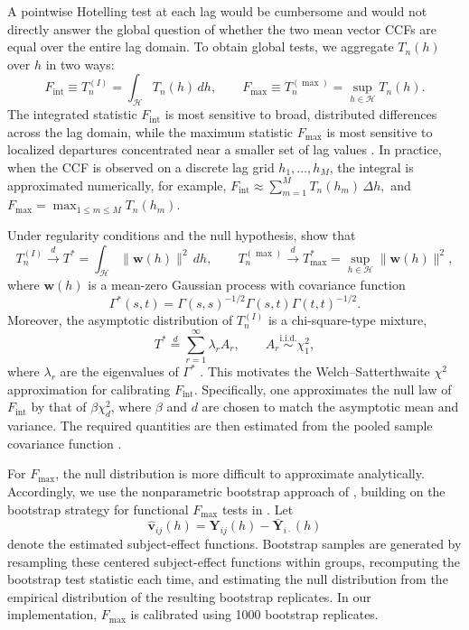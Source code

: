 \documentclass[12pt]{article}
\begin{document}
A pointwise Hotelling test at each lag would be cumbersome and would not directly answer the global question of whether the two mean vector CCFs are equal over the entire lag domain. To obtain global tests, we aggregate \(T_n(h)\) over \(h\) in two ways:
\[
F_{\mathrm{int}} \equiv T_n^{(I)} = \int_{\mathcal H} T_n(h)\,dh,
\qquad
F_{\max} \equiv T_n^{(\max)} = \sup_{h\in\mathcal H} T_n(h).
\]
The integrated statistic \(F_{\mathrm{int}}\) is most sensitive to broad, distributed differences across the lag domain, while the maximum statistic \(F_{\max}\) is most sensitive to localized departures concentrated near a smaller set of lag values \citep{qiu2021multivariate,zhang2019fmax}. In practice, when the CCF is observed on a discrete lag grid \(h_1,\ldots,h_M\), the integral is approximated numerically, for example,
$
F_{\mathrm{int}}
\approx
\sum_{m=1}^M T_n(h_m)\,\Delta h,
$
and
$
F_{\max}=\max_{1\le m\le M} T_n(h_m)
$.

Under regularity conditions and the null hypothesis, \citet{qiu2021multivariate} show that
\[
T_n^{(I)} \overset{d}{\longrightarrow} T^*
=
\int_{\mathcal H}\|\mathbf w(h)\|^2\,dh,
\qquad
T_n^{(\max)} \overset{d}{\longrightarrow} T^*_{\max}
=
\sup_{h\in\mathcal H}\|\mathbf w(h)\|^2,
\]
where \(\mathbf w(h)\) is a mean-zero Gaussian process with covariance function
\[
\Gamma^*(s,t)=\Gamma(s,s)^{-1/2}\Gamma(s,t)\Gamma(t,t)^{-1/2}.
\]
Moreover, the asymptotic distribution of \(T_n^{(I)}\) is a chi-square-type mixture,
\[
T^* \overset{d}{=} \sum_{r=1}^\infty \lambda_r A_r,
\qquad A_r \stackrel{\mathrm{i.i.d.}}{\sim} \chi^2_1,
\]
where \(\lambda_r\) are the eigenvalues of \(\Gamma^*\) \citep{qiu2021multivariate}. This motivates the Welch--Satterthwaite \(\chi^2\) approximation for calibrating \(F_{\mathrm{int}}\). Specifically, one approximates the null law of \(F_{\mathrm{int}}\) by that of \(\beta\chi^2_d\), where \(\beta\) and \(d\) are chosen to match the asymptotic mean and variance. The required quantities are then estimated from the pooled sample covariance function \citep{qiu2021multivariate,zhang2013hypothesis,zhang2014oneway}.

For \(F_{\max}\), the null distribution is more difficult to approximate analytically. Accordingly, we use the nonparametric bootstrap approach of \citet{qiu2021multivariate}, building on the bootstrap strategy for functional \(F_{\max}\) tests in \citet{zhang2019fmax}. Let
\[
\widehat{\mathbf v}_{ij}(h)=\mathbf Y_{ij}(h)-\bar{\mathbf Y}_{i\cdot}(h)
\]
denote the estimated subject-effect functions. Bootstrap samples are generated by resampling these centered subject-effect functions within groups, recomputing the bootstrap test statistic each time, and estimating the null distribution from the empirical distribution of the resulting bootstrap replicates. In our implementation, \(F_{\max}\) is calibrated using 1000 bootstrap replicates.
\end{document}
